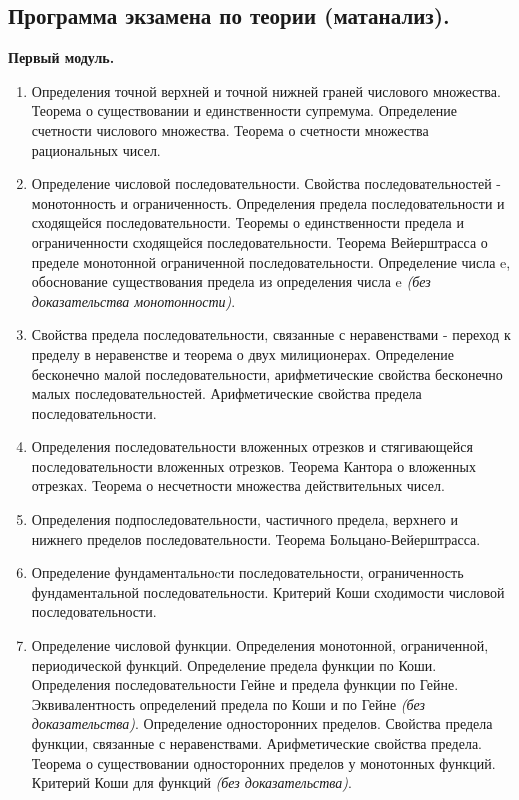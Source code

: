 \documentclass[a4paper,12pt]{article}
\begin{document}
\begin{center}
	\section*{Программа экзамена по теории (матанализ).}
	\textbf{Первый модуль.}
\end{center}

\begin{enumerate}

	\item Определения точной верхней и точной нижней граней числового множества. Теорема о существовании и единственности супремума. Определение счетности числового множества. Теорема о счетности множества рациональных чисел.
	\item Определение числовой последовательности. Свойства последовательностей - монотонность и ограниченность. Определения предела последовательности и сходящейся последовательности. Теоремы о единственности предела и ограниченности сходящейся последовательности. Теорема Вейерштрасса о пределе монотонной ограниченной последовательности. Определение числа e, обоснование существования предела из определения числа e \textit{(без доказательства монотонности)}.
	\item Свойства предела последовательности, связанные с неравенствами - переход к пределу в неравенстве и теорема о двух милиционерах. Определение бесконечно малой последовательности, арифметические свойства бесконечно малых последовательностей. Арифметические свойства предела последовательности.  
	\item Определения последовательности вложенных отрезков и стягивающейся последовательности вложенных отрезков. Теорема Кантора о вложенных отрезках. Теорема о несчетности множества действительных чисел.
	\item Определения подпоследовательности, частичного предела, верхнего и нижнего пределов последовательности. Теорема Больцано-Вейерштрасса. 
	\item Определение фундаментальноcти последовательности, ограниченность фундаментальной последовательности. Критерий Коши сходимости числовой последовательности.
	\item Определение числовой функции. Определения монотонной, ограниченной, периодической функций. Определение предела функции по Коши. Определения последовательности Гейне и предела функции по Гейне. Эквивалентность определений предела по Коши и по Гейне \textit{(без доказательства)}. Определение односторонних пределов. Свойства предела функции, связанные с неравенствами. Арифметические свойства предела. Теорема о существовании односторонних пределов у монотонных функций. Критерий Коши для функций \textit{(без доказательства)}.

\end{enumerate}
\end{document}
